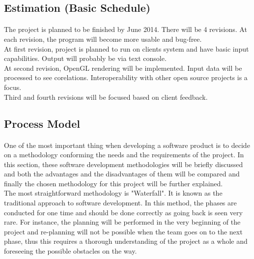 \documentclass[paper=a4, fontsize=12pt]{scrartcl}	%
\numberwithin{equation}{section}		%
\numberwithin{figure}{section}			%
\numberwithin{table}{section}				%
\newcommand{\skipsubsection}[0]{\vspace{1cm}}
\begin{document}
            
    \skipsubsection 
        
	\subsection{Estimation (Basic Schedule)}
    \paragraph{}
    The project is planned to be finished by June 2014. There will be 4 revisions. At each revision, the program will become more usable and bug-free.\\
    
    At first revision, project is planned to run on clients system and have basic input capabilities. Output will probably be via text console.\\
    
    At second revision, OpenGL rendering will be implemented. Input data will be processed to see corelations. Interoperability with other open source projects is a focus.\\
    
    Third and fourth revisions will be focused based on client feedback.\\
            
    \skipsubsection 
        
	\subsection{Process Model}
    \paragraph{}
	One of the most important thing when developing a software product is to decide on a methodology conforming the needs and the requirements of the project. In this section, these software development methodologies will be briefly discussed and both the advantages and the disadvantages of them will be compared and finally the chosen methodology for this project will be further explained. \\

The most straightforward methodology is "Waterfall". It is known as the traditional approach to software development. In this method, the phases are conducted for one time and should be done correctly as going back is seen very rare. For instance, the planning will be performed in the very beginning of the project and re-planning will not be possible when the team goes on to the next phase, thus this requires a thorough understanding of the project as a whole and foreseeing the possible obstacles on the way. \\
\end{document}
